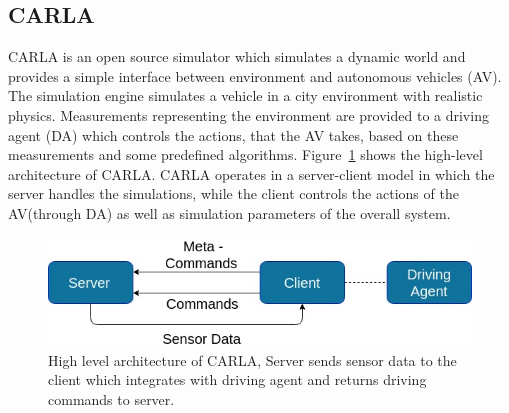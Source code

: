 \subsection{CARLA} \label{ri-carla}
CARLA is an open source simulator which simulates a dynamic world and provides a simple interface between environment and autonomous vehicles (AV). The simulation engine simulates a vehicle in a city environment with realistic physics. Measurements representing the environment are provided to a driving agent (DA) which controls the actions, that the AV takes, based on these measurements and some predefined algorithms. Figure~\ref{fig:carla_arch} shows the high-level architecture of CARLA. CARLA operates in a server-client model in which the server handles the simulations, while the client controls the actions of the AV(through DA) as well as simulation parameters of the overall system. 
 
 
 \begin{figure}  [h]
 	\vspace{-0.5em}
 	\centering
 	\includegraphics[scale=0.4]{CARLA_block}
 	\vspace{-0.5em}
 	\caption{High level architecture of CARLA, Server sends sensor data to the client which integrates with driving agent and returns driving commands to server.}
 	\label{fig:carla_arch}
 	\vspace{-1.5em}
 \end{figure}
 
 
